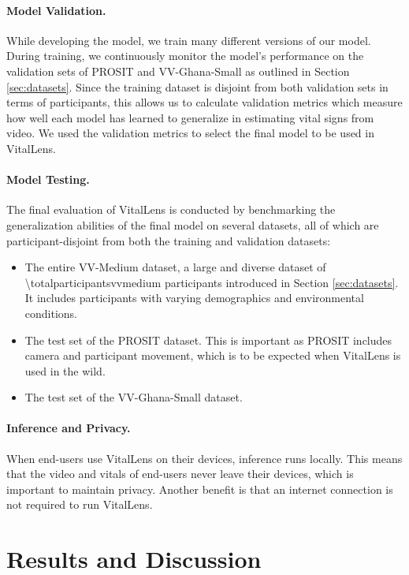\documentclass{article}
\begin{document}
\paragraph{Model Validation.}
While developing the model, we train many different versions of our model.
During training, we continuously monitor the model's performance on the validation sets of PROSIT and VV-Ghana-Small as outlined in Section \ref{sec:datasets}.
Since the training dataset is disjoint from both validation sets in terms of participants, this allows us to calculate validation metrics which measure how well each model has learned to generalize in estimating vital signs from video.
We used the validation metrics to select the final model to be used in VitalLens.

\paragraph{Model Testing.}
The final evaluation of VitalLens is conducted by benchmarking the generalization abilities of the final model on several datasets, all of which are participant-disjoint from both the training and validation datasets:

\begin{itemize}
	\item The entire VV-Medium dataset, a large and diverse dataset of \num{\totalparticipantsvvmedium} participants introduced in Section \ref{sec:datasets}. It includes participants with varying demographics and environmental conditions.
	\item The test set of the PROSIT dataset. This is important as PROSIT includes camera and participant movement, which is to be expected when VitalLens is used in the wild.
	\item The test set of the VV-Ghana-Small dataset.
\end{itemize}

\paragraph{Inference and Privacy.}
When end-users use VitalLens on their devices, inference runs locally.
This means that the video and vitals of end-users never leave their devices, which is important to maintain privacy.
Another benefit is that an internet connection is not required to run VitalLens.

\section{Results and Discussion}
\label{sec:results}
\end{document}
